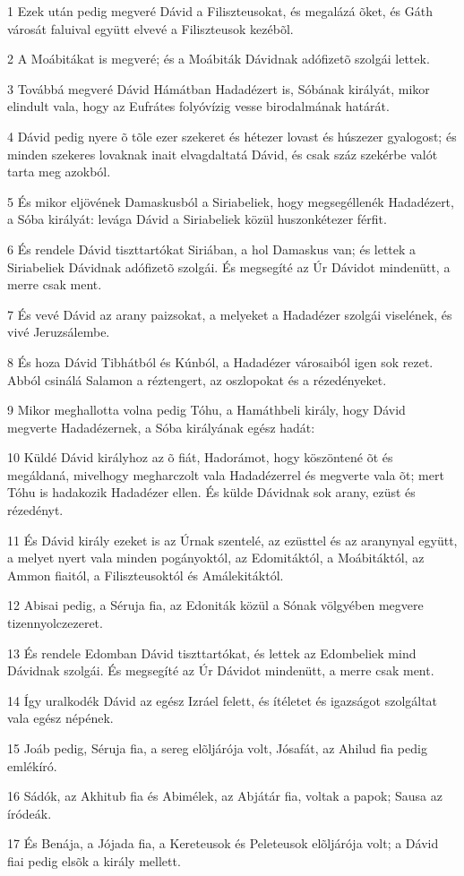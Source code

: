 \par 1 Ezek után pedig megveré Dávid a Filiszteusokat, és megalázá õket, és Gáth városát faluival együtt elvevé a Filiszteusok kezébõl.
\par 2 A Moábitákat is megveré; és a Moábiták Dávidnak adófizetõ szolgái lettek.
\par 3 Továbbá megveré Dávid Hámátban Hadadézert is, Sóbának királyát, mikor elindult vala, hogy az Eufrátes folyóvízig vesse birodalmának határát.
\par 4 Dávid pedig nyere õ tõle ezer szekeret és hétezer lovast és húszezer gyalogost; és minden szekeres lovaknak inait elvagdaltatá Dávid, és csak száz szekérbe valót tarta meg azokból.
\par 5 És mikor eljövének Damaskusból a Siriabeliek, hogy megsegéllenék Hadadézert, a Sóba királyát: levága Dávid a Siriabeliek közül huszonkétezer férfit.
\par 6 És rendele Dávid tiszttartókat Siriában, a hol Damaskus van; és lettek a Siriabeliek Dávidnak adófizetõ szolgái. És megsegíté az Úr Dávidot mindenütt, a merre csak ment.
\par 7 És vevé Dávid az arany paizsokat, a melyeket a Hadadézer szolgái viselének, és vivé Jeruzsálembe.
\par 8 És hoza Dávid Tibhátból és Kúnból, a Hadadézer városaiból igen sok rezet. Abból csinálá Salamon a  réztengert, az oszlopokat és a rézedényeket.
\par 9 Mikor meghallotta volna pedig Tóhu, a Hamáthbeli király, hogy Dávid megverte Hadadézernek, a Sóba királyának egész hadát:
\par 10 Küldé Dávid királyhoz az õ fiát, Hadorámot, hogy köszöntené õt és megáldaná, mivelhogy megharczolt vala Hadadézerrel és megverte vala õt; mert Tóhu is hadakozik Hadadézer ellen. És külde Dávidnak sok arany, ezüst és rézedényt.
\par 11 És Dávid király ezeket is az Úrnak szentelé, az ezüsttel és az aranynyal együtt, a melyet nyert vala minden pogányoktól, az Edomitáktól, a Moábitáktól, az Ammon fiaitól, a Filiszteusoktól és Amálekitáktól.
\par 12 Abisai pedig, a Séruja fia, az Edoniták közül a Sónak völgyében megvere tizennyolczezeret.
\par 13 És rendele Edomban Dávid tiszttartókat, és lettek az Edombeliek mind Dávidnak szolgái. És megsegíté az Úr Dávidot mindenütt, a merre csak ment.
\par 14 Így uralkodék Dávid az egész Izráel felett, és ítéletet és igazságot szolgáltat vala egész népének.
\par 15 Joáb pedig, Séruja fia, a sereg elõljárója volt, Jósafát, az Ahilud fia pedig emlékíró.
\par 16 Sádók, az Akhitub fia és Abimélek, az Abjátár fia, voltak a papok; Sausa az íródeák.
\par 17 És Benája, a Jójada fia, a Kereteusok és Peleteusok elõljárója volt; a Dávid fiai pedig elsõk a király mellett.


